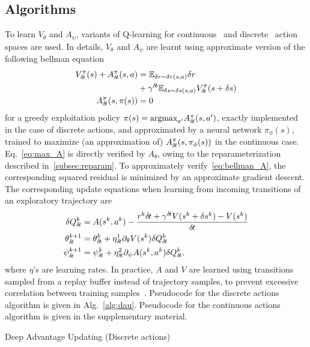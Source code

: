 \subsection{Algorithms}
\label{subsec:algorithm}
To learn $V_{\theta}$ and $A_{\psi}$, variants of Q-learning for continuous~\cite{ddpg} and
discrete~\cite{dqn} action spaces are used. In details, $V_{\theta}$ and $A_{\psi}$ are learnt
using approximate version of the following bellman equation
\begin{align}
	V^{\pi}_{\delta\hspace{-.1em}t}(s) + A^{\pi}_{\delta\hspace{-.1em}t}(s, a) &= \mathbb{E}_{\delta r \sim \delta r(s, a)}\delta r\nonumber\\ 
				   &+ \gamma^{{\delta\hspace{-.1em}t}}  \mathbb{E}_{\delta s \sim \delta s(s, a)} V^{\pi}_{\delta\hspace{-.1em}t}(s + \delta s)\label{eq:bellman_A}\\
	A^{\pi}_{\delta\hspace{-.1em}t}(s, \pi(s)) &= 0\label{eq:max_A}
\end{align}
for a greedy exploitation policy $\pi(s) = \text{argmax}_{a'}A^\pi_{\delta\hspace{-.1em}t}(s, a')$,
exactly implemented in the case of discrete actions, and approximated by a
neural network $\pi_\phi(s)$, trained to maximize (an approximation of)
$A^\pi_{\delta\hspace{-.1em}t}(s, \pi_\phi(s))$ in the continuous case.  Eq.~\eqref{eq:max_A} is
directly verified by $A_{\theta}$, owing to the reparameterization described
in~\ref{subsec:reparam}.  To approximately verify~\eqref{eq:bellman_A}, the
corresponding squared residual is minimized by an approximate gradient descent.
The corresponding update equations when learning from incoming transitions of
an exploratory trajectory are
\begin{align}
	\delta Q^k_{\delta\hspace{-.1em}t} &= A(s^k, a^k) - \frac{r^k {\delta\hspace{-.1em}t} + \gamma^{{\delta\hspace{-.1em}t}} V(s^{k}+\delta s^{k}) - V(s^k)}{{\delta\hspace{-.1em}t}}\\
	\theta^{k+1}_{\delta\hspace{-.1em}t} &= \theta^k_{\delta\hspace{-.1em}t} + \eta^1_{\delta\hspace{-.1em}t} \partial_{\theta} V(s^k) \delta Q^k_{\delta\hspace{-.1em}t}\\
	\psi^{k+1}_{\delta\hspace{-.1em}t} &= \psi^k_{\delta\hspace{-.1em}t} + \eta^2_{\delta\hspace{-.1em}t} \partial_{\psi} A(s^k, a^k) \delta Q^k_{\delta\hspace{-.1em}t}.
	\label{eq:approx_bellman_A}
\end{align}
where $\eta$'s are learning rates. In practice, $A$ and $V$ are learned using
transitions sampled from a replay buffer instead of trajectory samples, to
prevent excessive correlation between training samples~\cite{dqn}. Pseudocode
for the discrete actions algorithm is given in Alg.~\ref{alg:dau}. Pseudocode
for the continuous actions algorithm is given in the supplementary material.
\begin{algorithm}[ht]
	\caption{Deep Advantage Updating (Discrete actions)}
	
	\label{alg:dau}
\end{algorithm}

